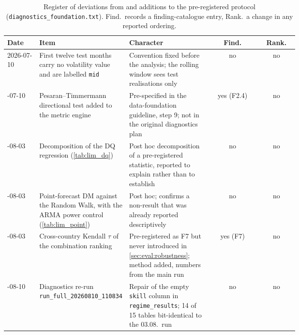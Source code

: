 \begin{table}[t]
\centering
\small
\caption{Register of deviations from and additions to the pre-registered protocol (\texttt{diagnostics\_foundation.txt}). Find.\ records a finding-catalogue entry, Rank.\ a change in any reported ordering.}
\label{tab:lim_amendments}
\begin{tabular}{@{}p{0.115\linewidth} p{0.29\linewidth} p{0.29\linewidth} cc@{}}
\toprule
Date & Item & Character & Find. & Rank. \\
\midrule
2026-07-10 & First twelve test months carry no volatility value and are
             labelled \texttt{mid} & Convention fixed before the analysis;
             the rolling window sees test realisations only & no & no \\
\addlinespace
2026-07-10 & Pesaran--Timmermann directional test added to the metric
             engine & Pre-specified in the data-foundation guideline,
             step 9; not in the original diagnostics plan & yes (F2.4) & no \\
\addlinespace
2026-08-03 & Decomposition of the DQ regression
             (\cref{tab:lim_dq}) & Post hoc decomposition of a
             pre-registered statistic, reported to explain rather than to
             establish & no & no \\
\addlinespace
2026-08-03 & Point-forecast DM against the Random Walk, with the ARMA
             power control (\cref{tab:lim_point}) & Post hoc; confirms a
             non-result that was already reported descriptively & no & no \\
\addlinespace
2026-08-03 & Cross-country Kendall $\tau$ of the combination ranking &
             Pre-registered as F7 but never introduced in
             \cref{sec:eval:robustness}; method added, numbers from the
             main run & yes (F7) & no \\
\addlinespace
2026-08-10 & Diagnostics re-run \texttt{run\_full\_20260810\_110834} &
             Repair of the empty \texttt{skill} column in
             \texttt{regime\_results}; 14 of 15 tables bit-identical to the
             03.08.\ run & no & no \\
\bottomrule
\end{tabular}
\end{table}
